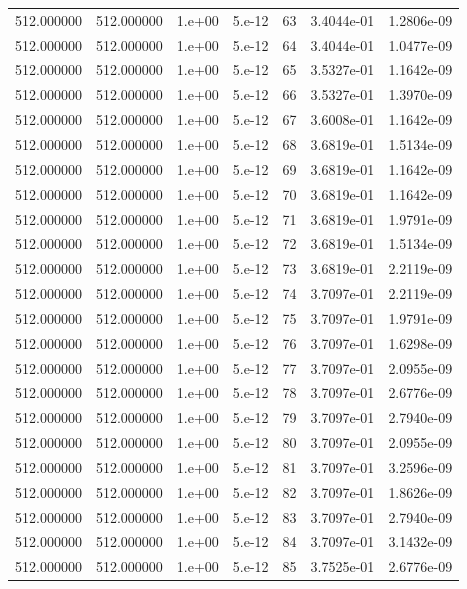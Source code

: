 \begin{table}[htbp]
\begin{tabular}{rrrrrrr}
512.000000 & 512.000000 & 1.e+00 & 5.e-12 & 63 & 3.4044e-01 & 1.2806e-09 \\
512.000000 & 512.000000 & 1.e+00 & 5.e-12 & 64 & 3.4044e-01 & 1.0477e-09 \\
512.000000 & 512.000000 & 1.e+00 & 5.e-12 & 65 & 3.5327e-01 & 1.1642e-09 \\
512.000000 & 512.000000 & 1.e+00 & 5.e-12 & 66 & 3.5327e-01 & 1.3970e-09 \\
512.000000 & 512.000000 & 1.e+00 & 5.e-12 & 67 & 3.6008e-01 & 1.1642e-09 \\
512.000000 & 512.000000 & 1.e+00 & 5.e-12 & 68 & 3.6819e-01 & 1.5134e-09 \\
512.000000 & 512.000000 & 1.e+00 & 5.e-12 & 69 & 3.6819e-01 & 1.1642e-09 \\
512.000000 & 512.000000 & 1.e+00 & 5.e-12 & 70 & 3.6819e-01 & 1.1642e-09 \\
512.000000 & 512.000000 & 1.e+00 & 5.e-12 & 71 & 3.6819e-01 & 1.9791e-09 \\
512.000000 & 512.000000 & 1.e+00 & 5.e-12 & 72 & 3.6819e-01 & 1.5134e-09 \\
512.000000 & 512.000000 & 1.e+00 & 5.e-12 & 73 & 3.6819e-01 & 2.2119e-09 \\
512.000000 & 512.000000 & 1.e+00 & 5.e-12 & 74 & 3.7097e-01 & 2.2119e-09 \\
512.000000 & 512.000000 & 1.e+00 & 5.e-12 & 75 & 3.7097e-01 & 1.9791e-09 \\
512.000000 & 512.000000 & 1.e+00 & 5.e-12 & 76 & 3.7097e-01 & 1.6298e-09 \\
512.000000 & 512.000000 & 1.e+00 & 5.e-12 & 77 & 3.7097e-01 & 2.0955e-09 \\
512.000000 & 512.000000 & 1.e+00 & 5.e-12 & 78 & 3.7097e-01 & 2.6776e-09 \\
512.000000 & 512.000000 & 1.e+00 & 5.e-12 & 79 & 3.7097e-01 & 2.7940e-09 \\
512.000000 & 512.000000 & 1.e+00 & 5.e-12 & 80 & 3.7097e-01 & 2.0955e-09 \\
512.000000 & 512.000000 & 1.e+00 & 5.e-12 & 81 & 3.7097e-01 & 3.2596e-09 \\
512.000000 & 512.000000 & 1.e+00 & 5.e-12 & 82 & 3.7097e-01 & 1.8626e-09 \\
512.000000 & 512.000000 & 1.e+00 & 5.e-12 & 83 & 3.7097e-01 & 2.7940e-09 \\
512.000000 & 512.000000 & 1.e+00 & 5.e-12 & 84 & 3.7097e-01 & 3.1432e-09 \\
512.000000 & 512.000000 & 1.e+00 & 5.e-12 & 85 & 3.7525e-01 & 2.6776e-09 \\

\end{tabular}
\end{table}
